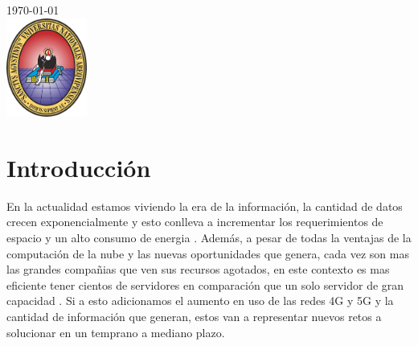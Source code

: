 \documentclass{article}
\begin{document}
\begin{titlepage}
	
	
	{\large \today}\\[2cm] %
	
	
	\includegraphics[width=100px, keepaspectratio]{img/unsa}\\[1cm] %
	
	
	\vfill %
	
\end{titlepage}	
	
	
	

	
	
\tableofcontents
\newpage	
	

	
		
	
\section{Introducción}
	
En la actualidad estamos viviendo la era de la información, la cantidad de datos crecen exponencialmente y esto conlleva a incrementar los requerimientos de espacio y un alto consumo de  energia \citep{baliga2010green, kant2009data}. Además, a pesar de todas la ventajas de la computación de la nube y las nuevas oportunidades que genera, cada vez son mas las grandes compañias que ven sus recursos agotados, en este contexto es mas eficiente tener cientos de servidores en comparación que un solo servidor de gran capacidad \citep{chandransurvey}. Si a esto adicionamos el aumento en uso de las redes 4G y 5G y la cantidad de información que generan, estos van a representar nuevos retos a solucionar en un temprano a mediano plazo.\\
	
\end{document}
